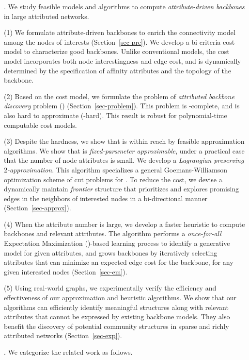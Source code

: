 . We study feasible models and algorithms
to compute {\em attribute-driven backbones} in large attributed networks.

\stab
(1) We formulate attribute-driven backbones to enrich 
the connectivity model among the nodes of interests (Section~\ref{sec-pre}).
We develop a bi-criteria cost model to characterize
good backbones. Unlike conventional models, 
the cost model incorporates both
node interestingness and edge cost, and 
is dynamically determined by the specification of 
affinity attributes and the 
topology of the backbone.

\stab
(2) Based on the cost model, we
formulate the problem of
{\em attributed backbone discovery} problem (\abd) (Section~\ref{sec-problem}).
This problem is
\NP-complete, and is also hard to approximate (\APX-hard).
This result is robust for
polynomial-time computable
cost models.

\stab
(3) Despite the hardness, we show that
\abd is within reach by feasible approximation algorithms.
We show that \abd is {\em fixed-parameter approximable},
under a practical case that the number of node attributes is small.
We develop a {\em Lagrangian preserving $2$-approximation}.
This algorithm specializes a general Goemans-Williamson optimization scheme of
cut problems for \abd. To reduce the cost, we devise a dynamically
maintain {\em frontier} structure that prioritizes and
explores promising edges in the neighbors of
interested nodes in a bi-directional manner (Section~\ref{sec-approx}).

\stab
(4) When the attribute number is large,
we develop a faster heuristic to compute
backbones and relevant attributes. The algorithm
performs a {\em once-for-all} Expectation Maximization (\EM)-based
learning process to identify
a generative model for given attributes, and
grows backbones by iteratively
selecting attributes that can minimize an expected
edge cost for the backbone, for any
given interested nodes (Section~\ref{sec-em}).

\stab
(5) Using real-world graphs, we experimentally verify
the efficiency and effectiveness of our approximation and
heuristic algorithms. We show that our algorithms
can efficiently identify meaningful structures along with relevant attributes that cannot be expressed by
existing backbone models. They also benefit the discovery of potential community structures
in sparse and richly attributed networks
(Section~\ref{sec-exp}).

. We categorize the related work as follows.

